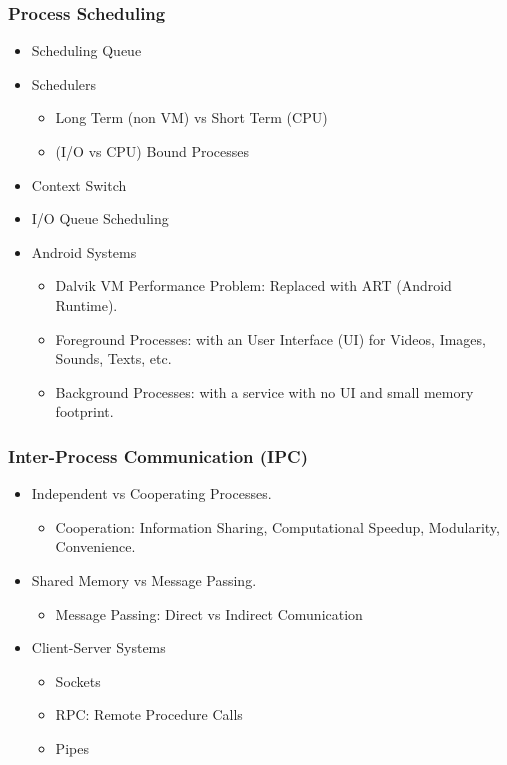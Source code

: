 \documentclass[xcolor=table, notheorems, hyperref={pdfpagelabels=false}]{beamer}
\begin{document}
\begin{frame}
\frametitle{Process Scheduling}
\begin{itemize}
\item Scheduling Queue
\item Schedulers
\begin{itemize}
\item Long Term (non VM) vs Short Term (CPU)
\item (I/O vs CPU) Bound Processes
\end{itemize}
\item Context Switch
\item I/O Queue Scheduling
\item Android Systems
\begin{itemize}
\item Dalvik VM Performance Problem: Replaced with ART (Android Runtime).
\item Foreground Processes: with an User Interface (UI) for Videos, Images, Sounds, Texts, etc.
\item Background Processes: with a service with no UI and small memory footprint.
\end{itemize}
\end{itemize}
\end{frame}

\begin{frame}
\frametitle{Inter-Process Communication (IPC)}
\begin{itemize}
\item Independent vs Cooperating Processes.
\begin{itemize}
\item Cooperation: Information Sharing, Computational Speedup, Modularity, Convenience.
\end{itemize}
\item Shared Memory vs Message Passing.
\begin{itemize}
\item Message Passing: Direct vs Indirect Comunication
\end{itemize}
\item Client-Server Systems
\begin{itemize}
\item Sockets
\item RPC: Remote Procedure Calls
\item Pipes
\end{itemize}
\end{itemize}
\end{frame}
\end{document}
